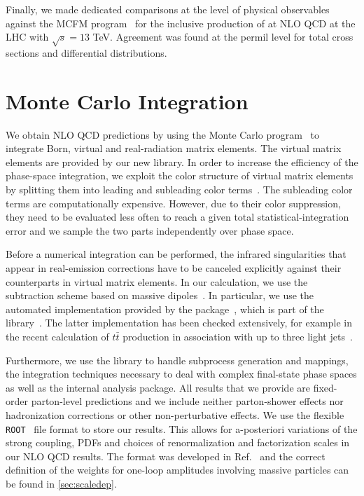 Finally, we made dedicated comparisons at the level of physical observables
against the MCFM program~\cite{mcfm7} for the inclusive production of \Wbb{}
at NLO QCD at the LHC with $\sqrt{s}=13$ TeV. Agreement was found at the permil level for total cross sections
and differential distributions.






\section{Monte Carlo Integration}
\label{sec:wbb:mc_integration}

We obtain NLO QCD predictions by using the \SHERPA{} 
Monte Carlo program~\cite{Sherpa} to integrate Born, virtual and real-radiation
matrix elements. The virtual matrix elements are provided by our new \BlackHat{} library. In order to increase the efficiency of the phase-space integration, we exploit the color structure of virtual matrix
elements by splitting them into leading and subleading color
terms~\cite{BH:W3jDistributions,Ita:2011ar}. The subleading color terms are computationally expensive. However, due to their color suppression, they need to be evaluated less often to reach a
given total statistical-integration error and we sample the two parts independently over
phase space.

Before a numerical integration can be performed, the infrared singularities that appear in real-emission corrections have to be canceled explicitly against their counterparts in virtual matrix elements. In our calculation, we
use the subtraction scheme based on massive dipoles~\cite{Catani2002}.
In particular, we use the automated implementation provided by
the \COMIX{} package~\cite{Comix}, which is part of the \SHERPA{}
library~\cite{Sherpa}. The latter implementation has been checked extensively, for example in the recent calculation of $t\bar t$ production in association
with up to three light jets~\cite{ttjjj}. 

Furthermore, we use the \SHERPA{} library to handle subprocess generation and
mappings, the integration techniques necessary to deal with complex final-state
phase spaces as well as the internal analysis package. 
%
All results that we provide are fixed-order parton-level predictions and we include neither parton-shower effects nor hadronization corrections or other
non-perturbative effects.
%
We use the flexible \texttt{ROOT}~\cite{ROOT} \ntuple{} file format to store our results. This allows for a-posteriori variations of the strong coupling,
PDFs and choices of renormalization and factorization
scales in our NLO QCD results. The \ntuple{} format was developed in
Ref.~\cite{BH:Ntuples} and the correct definition of the weights for
one-loop amplitudes involving massive particles can be found in \cref{sec:scaledep}.

